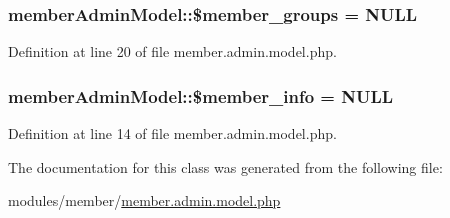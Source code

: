 \subsubsection[{\$member\+\_\+groups}]{\setlength{\rightskip}{0pt plus 5cm}member\+Admin\+Model\+::\$member\+\_\+groups = N\+U\+L\+L}\label{classmemberAdminModel_a4147285c4d6a90b6d73c2d4f2b974b3b}


Definition at line 20 of file member.\+admin.\+model.\+php.

\hypertarget{classmemberAdminModel_a4d4a6cc79e642c4dfabcf5f6666991b2}{}
\subsubsection[{\$member\+\_\+info}]{\setlength{\rightskip}{0pt plus 5cm}member\+Admin\+Model\+::\$member\+\_\+info = N\+U\+L\+L}\label{classmemberAdminModel_a4d4a6cc79e642c4dfabcf5f6666991b2}


Definition at line 14 of file member.\+admin.\+model.\+php.



The documentation for this class was generated from the following file\+:\begin{DoxyCompactItemize}
\item 
modules/member/\hyperlink{member_8admin_8model_8php}{member.\+admin.\+model.\+php}\end{DoxyCompactItemize}
